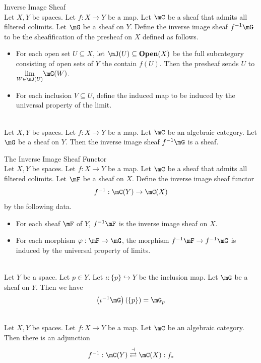 \documentclass[a4paper]{article}
\begin{document}
\begin{defn}{Inverse Image Sheaf}{}\\
Let $X,Y$ be spaces. Let $f:X\to Y$ be a map. Let $\mC$ be a sheaf that admits all filtered colimits. Let $\mG$ be a sheaf on $Y$. Define the inverse image sheaf $f^{-1}\mG$ to be the sheafification of the presheaf on $X$ defined as follows. 
\begin{itemize}
\item For each open set $U\subseteq X$, let $\mJ(U)\subseteq\bold{Open}(X)$ be the full subcategory consisting of open sets of $Y$ the contain $f(U)$. Then the presheaf sends $U$ to $\underset{W\in\mJ(U)}{\lim}\mG(W)$. 
\item For each inclusion $V\subseteq U$, define the induced map to be induced by the universal property of the limit. 
\end{itemize}
\end{defn}

\begin{prp}{}{}\\
Let $X,Y$ be spaces. Let $f:X\to Y$ be a map. Let $\mC$ be an algebraic category. Let $\mG$ be a sheaf on $Y$. Then the inverse image sheaf $f^{-1}\mG$ is a sheaf. 
\end{prp}

\begin{defn}{The Inverse Image Sheaf Functor}{}\\
Let $X,Y$ be spaces. Let $f:X\to Y$ be a map. Let $\mC$ be a sheaf that admits all filtered colimits. Let $\mF$ be a sheaf on $X$. Define the inverse image sheaf functor $$f^{-1}:\mC(Y)\to\mC(X)$$ by the following data. 
\begin{itemize}
\item For each sheaf $\mF$ of $Y$, $f^{-1}\mF$ is the inverse image sheaf on $X$. 
\item For each morphism $\varphi:\mF\to\mG$, the morphism $f^{-1}\mF\to f^{-1}\mG$ is induced by the universal property of limits. 
\end{itemize}
\end{defn}

\begin{eg}{}{}\\
Let $Y$ be a space. Let $p\in Y$. Let $\iota:\{p\}\hookrightarrow Y$ be the inclusion map. Let $\mG$ be a sheaf on $Y$. Then we have $$\left(\iota^{-1}\mG\right)(\{p\})=\mG_p$$
\end{eg}

\begin{prp}{}{}\\
Let $X,Y$ be spaces. Let $f:X\to Y$ be a map. Let $\mC$ be an algebraic category. Then there is an adjunction $$f^{-1}:\mC(Y)\overset{\dashv}{\rightleftarrows}\mC(X):f_\ast$$
\end{prp}
\end{document}
